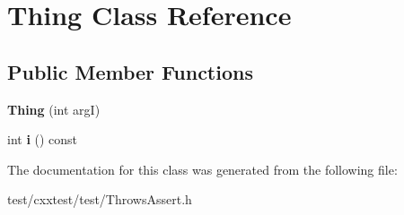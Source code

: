 \hypertarget{classThing}{\section{Thing Class Reference}
\label{classThing}
}
\subsection*{Public Member Functions}
\begin{DoxyCompactItemize}
\item 
\hypertarget{classThing_afbd551d6913e09e94d0c8e946422858b}{{\bfseries Thing} (int arg\-I)}\label{classThing_afbd551d6913e09e94d0c8e946422858b}

\item 
\hypertarget{classThing_a7525e2b1bbe15fe3304077203428729b}{int {\bfseries i} () const }\label{classThing_a7525e2b1bbe15fe3304077203428729b}

\end{DoxyCompactItemize}


The documentation for this class was generated from the following file\-:\begin{DoxyCompactItemize}
\item 
test/cxxtest/test/Throws\-Assert.\-h\end{DoxyCompactItemize}
